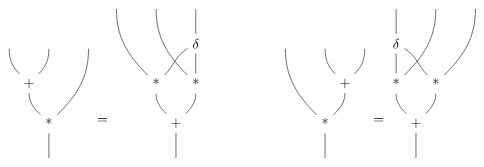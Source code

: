 \begin{displaymath}
  \begin{matrix}
    \begin{tikzpicture}[baseline]
      \path
      (-1,2) node(x) {}
      (0,2) node(y) {}
      (-0.5,1) node(+) {+}
      (1,2) node(z) {}
      (0,0) node(*) {*}
      (0,-1) node(res) {}
      ;

      \draw (x) to[out=270,in=135] (+);
      \draw (y) to[out=270,in=45] (+);
      \draw (+) to[out=270,in=135] (*);
      \draw (z) to[out=270,in=45] (*);
      \draw (*) -- (res);
    \end{tikzpicture}
    =
    \begin{tikzpicture}[baseline]
      \path
      (-2,3) node(x) {}
      (-1,3) node(y) {}
      (0,3) node(z) {}
      (0,2) node(dup) {$\delta$}
      (-1,1) node(x*) {*}
      (0,1) node(y*) {*}
      (-0.5,0) node(+) {+}
      (-0.5,-1) node(res) {}
      ;

      \draw (z) -- (dup);
      \draw (x) to[out=270,in=135] (x*);
      \draw (y) to[out=270,in=135] (y*);
      \draw (dup) to[out=-150,in=45] (x*);
      \draw (dup) -- (y*);
      \draw (x*) to[out=270,in=135] (+);
      \draw (y*) to[out=270,in=45] (+);
      \draw (+) -- (res);
    \end{tikzpicture}
    &\phantom{mmmm}&
    \begin{tikzpicture}[baseline]
      \path
      (1,2) node(x) {}
      (0,2) node(y) {}
      (0.5,1) node(+) {+}
      (-1,2) node(z) {}
      (0,0) node(*) {*}
      (0,-1) node(res) {}
      ;

      \draw (x) to[out=270,in=45] (+);
      \draw (y) to[out=270,in=135] (+);
      \draw (+) to[out=270,in=45] (*);
      \draw (z) to[out=270,in=135] (*);
      \draw (*) -- (res);
    \end{tikzpicture}
    =
    \begin{tikzpicture}[baseline]
      \path
      (2,3) node(x) {}
      (1,3) node(y) {}
      (0,3) node(z) {}
      (0,2) node(dup) {$\delta$}
      (1,1) node(x*) {*}
      (0,1) node(y*) {*}
      (0.5,0) node(+) {+}
      (0.5,-1) node(res) {}
      ;

      \draw (z) -- (dup);
      \draw (x) to[out=270,in=45] (x*);
      \draw (y) to[out=270,in=45] (y*);
      \draw (dup) to[out=-30,in=135] (x*);
      \draw (dup) -- (y*);
      \draw (x*) to[out=270,in=45] (+);
      \draw (y*) to[out=270,in=135] (+);
      \draw (+) -- (res);
    \end{tikzpicture}
  \end{matrix}
\end{displaymath}

